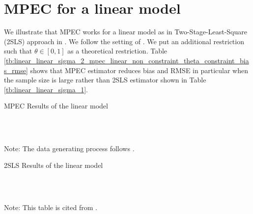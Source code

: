 \documentclass[11pt, a4paper]{article}
\begin{document}
\newpage




\newpage
\appendix

\section{MPEC for a linear model}

We illustrate that MPEC works for a linear model as in Two-Stage-Least-Square (2SLS) approach in \cite{matsumura2023revisiting}. 
We follow the setting of \cite{matsumura2023revisiting}.
We put an additional restriction such that $\theta\in[0,1]$ as a theoretical restriction. Table \ref{tb:linear_linear_sigma_2_mpec_linear_non_constraint_theta_constraint_bias_rmse} shows that MPEC estimator reduces bias and RMSE in particular when the sample size is large rather than 2SLS estimator shown in Table \ref{tb:linear_linear_sigma_1}.



\begin{table}[!htbp]
  \begin{center}
      \caption{MPEC Results of the linear model}
      \label{tb:linear_linear_sigma_2_mpec_linear_non_constraint_theta_constraint_bias_rmse} 
      \subfloat[$\sigma=0.001$]{}\\
      \subfloat[$\sigma=0.5$]{}\\
    \subfloat[$\sigma=2.0$]{}
  \end{center}
  \footnotesize
  Note: The data generating process follows \cite{matsumura2023revisiting}.
\end{table} 


\begin{table}[!htbp]
  \begin{center}
      \caption{2SLS Results of the linear model}
      \label{tb:linear_linear_sigma_1} 
      \subfloat[$\sigma=0.001$]{}\\
      \subfloat[$\sigma=0.5$]{}\\
    \subfloat[$\sigma=2.0$]{}
  \end{center}
  \footnotesize
  Note: This table is cited from \cite{matsumura2023revisiting}.
\end{table} 
\end{document}
